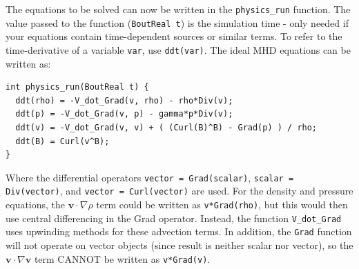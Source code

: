 \documentclass[12pt]{article}
\newcommand{\code}[1]{\texttt{#1}}
\begin{document}
The equations to be solved can now be written in the \code{physics\_run} function. The value
passed to the function (\code{BoutReal t}) is the simulation time - only needed if your
equations contain time-dependent sources or similar terms. To refer to the time-derivative
of a variable \code{var}, use \code{ddt(var)}. The ideal MHD equations can be written as:
\begin{lstlisting}
int physics_run(BoutReal t) {
  ddt(rho) = -V_dot_Grad(v, rho) - rho*Div(v);
  ddt(p) = -V_dot_Grad(v, p) - gamma*p*Div(v);
  ddt(v) = -V_dot_Grad(v, v) + ( (Curl(B)^B) - Grad(p) ) / rho;
  ddt(B) = Curl(v^B);
}
\end{lstlisting}
Where the differential operators \code{vector = Grad(scalar)}, \code{scalar = Div(vector)}, and
\code{vector = Curl(vector)} are used. For the density and pressure equations,
the $\mathbf{v}\cdot\nabla\rho$ term could be written as \code{v*Grad(rho)}, but this would then use
central differencing in the Grad operator. Instead, the function \code{V\_dot\_Grad} uses upwinding
methods for these advection terms. In addition, the \code{Grad} function will not operate
on vector objects (since result is neither scalar nor vector), so the $\mathbf{v}\cdot\nabla\mathbf{v}$ term CANNOT be written as \code{v*Grad(v)}.
\end{document}
